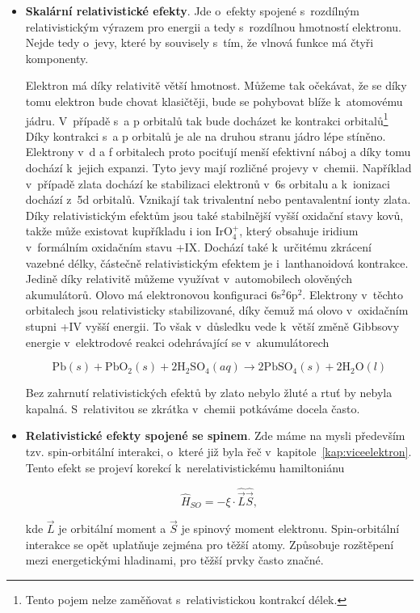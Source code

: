 \begin{itemize} 

\item \textbf{Skalární relativistické efekty}. Jde o~efekty spojené s~rozdílným relativistickým výrazem pro energii a tedy s~rozdílnou hmotností elektronu. Nejde tedy o~jevy, které by souvisely s~tím, že vlnová funkce má čtyři komponenty. 

Elektron má díky relativitě větší hmotnost. Můžeme tak očekávat, že se díky tomu elektron bude chovat klasičtěji, bude se pohybovat blíže k~atomovému jádru. V~případě s~a p orbitalů tak bude docházet ke kontrakci orbitalů\footnote{Tento pojem nelze zaměňovat s~relativistickou kontrakcí délek.} Díky kontrakci s~a p orbitalů je ale na druhou stranu jádro lépe stíněno. Elektrony v~d a f orbitalech proto pociťují menší efektivní náboj a díky tomu dochází k~jejich expanzi. Tyto jevy mají rozličné projevy v~chemii. Například v~případě zlata dochází ke stabilizaci elektronů v~6s orbitalu a k~ionizaci dochází z~5d orbitalů. Vznikají tak trivalentní nebo pentavalentní ionty zlata. Díky relativistickým efektům jsou také stabilnější vyšší oxidační stavy kovů, takže může existovat kupříkladu i ion IrO$_4^+$, který obsahuje iridium v~formálním oxidačním stavu +IX. Dochází také k~určitému zkrácení vazebné délky, částečně relativistickým efektem je i~lanthanoidová kontrakce. Jedině díky relativitě můžeme využívat v~automobilech olověných akumulátorů. Olovo má elektronovou konfiguraci 6s$^2$6p$^2$. Elektrony v~těchto orbitalech jsou relativisticky stabilizované, díky čemuž má olovo v~oxidačním stupni +IV vyšší energii. To však v~důsledku vede k~větší změně Gibbsovy energie v~elektrodové reakci odehrávající se v~akumulátorech

\begin{equation}
\mbox{Pb}(s) + \mbox{PbO}_2(s) + 2 \mbox{H}_2\mbox{SO}_4 (aq) \rightarrow 2 \mbox{PbSO}_4 (s) + 2 \mbox{H}_2\mbox{O} (l)
\label{rov:Rel-10}
\end{equation}

\noindent Bez zahrnutí relativistických efektů by zlato nebylo žluté a rtuť by nebyla kapalná. S~relativitou se zkrátka v~chemii potkáváme docela často. 

\item \textbf{Relativistické efekty spojené se spinem}. Zde máme na mysli především tzv. spin-orbitální interakci, o~které již byla řeč v~kapitole~\ref{kap:viceelektron}. Tento efekt se projeví korekcí k~nerelativistickému hamiltoniánu

\begin{equation}
\hat{H}_{SO} = - \xi \cdot \hat{\vec{L}} \hat{\vec{S}},
\label{rov:Rel-11}
\end{equation}

\noindent
kde $\vec{L}$ je orbitální moment a $\vec{S}$ je spinový moment elektronu. Spin-orbitální interakce se opět uplatňuje zejména pro těžší atomy. Způsobuje rozštěpení mezi energetickými hladinami, pro těžší prvky často značné.

\end{itemize}

